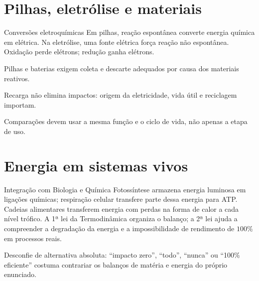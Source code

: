 \documentclass{notaaula}
\begin{document}
\section{Pilhas, eletrólise e materiais}

\begin{copiar}{Conversões eletroquímicas}
Em pilhas, reação espontânea converte energia química em elétrica. Na eletrólise, uma fonte elétrica
força reação não espontânea. Oxidação perde elétrons; redução ganha elétrons.
\begin{itens}
\item Pilhas e baterias exigem coleta e descarte adequados por causa dos materiais reativos.
\item Recarga não elimina impactos: origem da eletricidade, vida útil e reciclagem importam.
\item Comparações devem usar a mesma função e o ciclo de vida, não apenas a etapa de uso.
\end{itens}
\end{copiar}

\section{Energia em sistemas vivos}

\begin{copiar}{Integração com Biologia e Química}
Fotossíntese armazena energia luminosa em ligações químicas; respiração celular transfere parte dessa
energia para ATP. Cadeias alimentares transferem energia com perdas na forma de calor a cada nível
trófico. A 1ª lei da Termodinâmica organiza o balanço; a 2ª lei ajuda a compreender a degradação da
energia e a impossibilidade de rendimento de $100\%$ em processos reais.
\end{copiar}

\begin{dica}
Desconfie de alternativa absoluta: ``impacto zero'', ``todo'', ``nunca'' ou ``100\% eficiente'' costuma
contrariar os balanços de matéria e energia do próprio enunciado.
\end{dica}
\end{document}

